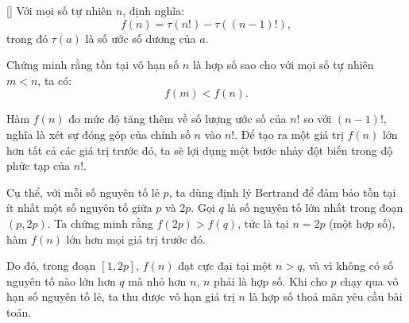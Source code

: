 \documentclass[../04-diophantine-equations.tex]{subfiles}
\begin{document}
\begin{example*}\label{example:CHN-2015-TST3-D2-P3}[\textbf{}]
	Với mọi số tự nhiên \( n \), định nghĩa:
	\[
		f(n) = \tau(n!) - \tau((n-1)!),
	\]
	trong đó \( \tau(a) \) là số ước số dương của \( a \).  
	
	Chứng minh rằng tồn tại vô hạn số \( n \) là hợp số sao cho với mọi số tự nhiên \( m < n \), ta có:
	\[
		f(m) < f(n).
	\]
\end{example*}

\begin{story*}
    Hàm \( f(n) \) đo mức độ tăng thêm về số lượng ước số của \( n! \) so với \( (n-1)! \), nghĩa là xét sự đóng góp của chính số \( n \) vào \( n! \).  
    Để tạo ra một giá trị \( f(n) \) lớn hơn tất cả các giá trị trước đó, ta sẽ lợi dụng một bước nhảy đột biến trong độ phức tạp của \( n! \).

    Cụ thể, với mỗi số nguyên tố lẻ \( p \), ta dùng định lý Bertrand để đảm bảo tồn tại ít nhất một số nguyên tố giữa \( p \) và \( 2p \).  
    Gọi \( q \) là số nguyên tố lớn nhất trong đoạn \( (p, 2p) \).  
    Ta chứng minh rằng \( f(2p) > f(q) \), tức là tại \( n = 2p \) (một hợp số), hàm \( f(n) \) lớn hơn mọi giá trị trước đó.

    Do đó, trong đoạn \( [1, 2p] \), \( f(n) \) đạt cực đại tại một \( n > q \), và vì không có số nguyên tố nào lớn hơn \( q \) mà nhỏ hơn \( n \), \( n \) phải là hợp số.  
    Khi cho \( p \) chạy qua vô hạn số nguyên tố lẻ, ta thu được vô hạn giá trị \( n \) là hợp số thoả mãn yêu cầu bài toán.
\end{story*}

\bigbreak
\end{document}
